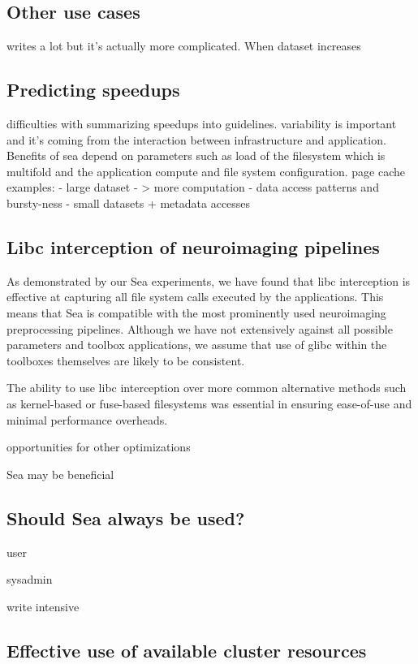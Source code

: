 \documentclass[10pt,journal,compsoc]{IEEEtran}
\begin{document}
\subsection{Other use cases}
writes a lot but it's actually more complicated. When dataset increases
\subsection{Predicting speedups}
 difficulties with summarizing speedups into guidelines.
 variability is important and it's coming from the interaction between infrastructure and application.
 Benefits of sea depend on parameters such as load of the filesystem which is multifold and the application compute and
 file system configuration. 
 page cache
 examples:
  - large dataset - > more computation
  - data access patterns and bursty-ness
  - small datasets + metadata accesses

\subsection{Libc interception of neuroimaging pipelines}

As demonstrated by our Sea experiments, we have found that libc interception is effective at capturing all file system
calls executed by the applications. This means that Sea is compatible with the most prominently used neuroimaging
preprocessing pipelines. Although we have not extensively against all possible parameters and toolbox applications, we
assume that use of glibc within the toolboxes themselves are likely to be consistent.

The ability to use libc interception over more common alternative methods such as kernel-based or fuse-based filesystems
was essential in ensuring ease-of-use and minimal performance overheads. 

opportunities for other optimizations

Sea may be beneficial
\subsection{Should Sea always be used?}

user

sysadmin

write intensive



\subsection{Effective use of available cluster resources}
\end{document}
